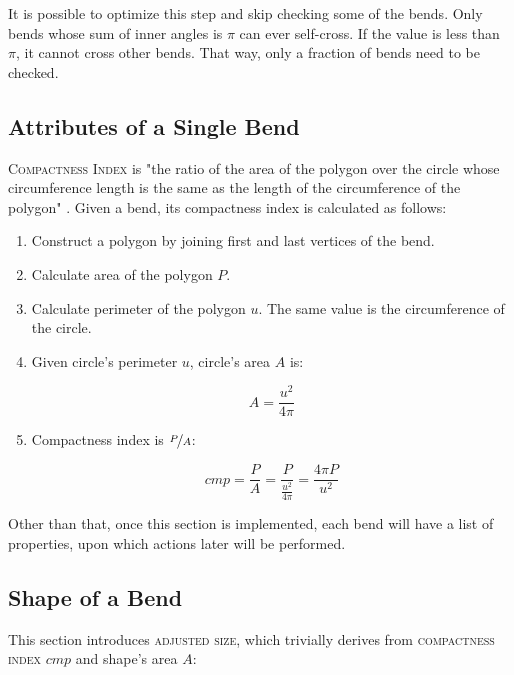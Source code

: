 \documentclass[a4paper]{article}
\begin{document}
It is possible to optimize this step and skip checking some of the bends. Only
bends whose sum of inner angles is $\pi$ can ever self-cross. If the value is
less than $\pi$, it cannot cross other bends. That way, only a fraction of
bends need to be checked.

\subsection{Attributes of a Single Bend}



\textsc{Compactness Index} is "the ratio of the area of the polygon over the
circle whose circumference length is the same as the length of the
circumference of the polygon" \cite{wang1998line}. Given a bend, its
compactness index is calculated as follows:

\begin{enumerate}

  \item Construct a polygon by joining first and last vertices of the bend.

  \item Calculate area of the polygon $P$.

  \item Calculate perimeter of the polygon $u$. The same value is the
    circumference of the circle.

  \item Given circle's perimeter $u$, circle's area $A$ is:

    \[
      A = \frac{u^2}{4\pi}
    \]

  \item Compactness index is $\nicefrac{P}{A}$:

    \[
      cmp = \frac{P}{A} = \frac{P}{ \frac{u^2}{4\pi} } = \frac{4\pi P}{u^2}
    \]

\end{enumerate}

Other than that, once this section is implemented, each bend will have a list
of properties, upon which actions later will be performed.

\subsection{Shape of a Bend}

This section introduces \textsc{adjusted size}, which trivially derives from
\textsc{compactness index} $cmp$ and shape's area $A$:
\end{document}
